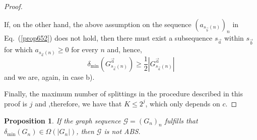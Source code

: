 \documentclass[a4paper,onecolumn,accepted=2024-12-14]{quantumarticle}
\newtheorem{proposition}[theorem]{Proposition}
\theoremstyle{plain}
\newcommand{\cG}{{\mathcal G}}         %
\begin{document}
\begin{proof}
\begin{itemize}
 If, on the other hand, the above assumption on the sequence $(a_{s_{\vec{b}}(n)})_n$ in Eq.\ (\ref{prop652}) does not hold, then there must exist a subsequence $s_{\vec{a}}$ within $s_{\vec{b}}$ for which $a_{s_{\vec{a}}(n)}\geq0$ for every $n$ and, hence,
\begin{equation}
 \delta_{\mathrm{min}}(G_{s_{\vec{a}}(n)}^{\vec{a}})
         \geq\frac{1}{2}|G_{s_{\vec{a}}(n)}^{\vec{a}}|
\end{equation}
and we are, again, in case b).
\end{itemize}
Finally, the maximum number of splittings in the procedure described
in this proof is $j$ and ,therefore, we have that  $K\leq 2^j$, which only depends on $c$.
\end{proof}


\begin{proposition}\label{pro:degAGME}
If the graph sequence $\cG=(G_n)_n$ fulfills that
$\delta_{\mathrm{min}}(G_n)\in\Omega(|G_n|)$,
then $\cG$ is not ABS.
\end{proposition}
\end{document}
